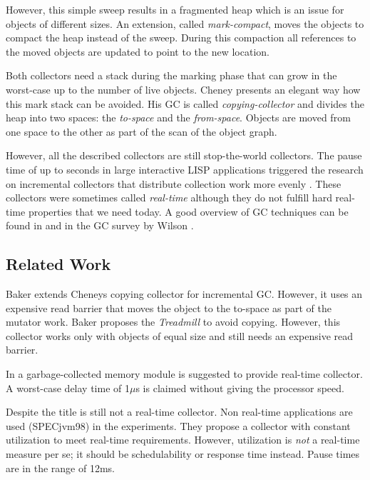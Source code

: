 However, this simple sweep results in a fragmented heap which is an
issue for objects of different sizes. An extension, called
\emph{mark-compact}, moves the objects to compact the heap instead
of the sweep. During this compaction all references to the moved
objects are updated to point to the new location.


Both collectors need a stack during the marking phase that can grow
in the worst-case up to the number of live objects. Cheney
\cite{gc:cheney70} presents an elegant way how this mark stack can
be avoided. His GC is called \emph{copying-collector} and divides
the heap into two spaces: the \emph{to-space} and the
\emph{from-space}. Objects are moved from one space to the other as
part of the scan of the object graph.

However, all the described collectors are still stop-the-world
collectors. The pause time of up to seconds in large interactive
LISP applications triggered the research on incremental collectors
that distribute collection work more evenly \cite{gc:steele75,
gc:dijkstra78, gc:baker78}. These collectors were sometimes called
\emph{real-time} although they do not fulfill hard real-time
properties that we need today. A good overview of GC techniques can
be found in \cite{gc:jone96} and in the GC survey by Wilson
\cite{gc:wils94}.

\subsection{Related Work}

Baker \cite{gc:baker78} extends Cheneys \cite{gc:cheney70} copying
collector for incremental GC. However, it uses an expensive read
barrier that moves the object to the to-space as part of the mutator
work. Baker proposes the \emph{Treadmill} \cite{gc:baker92} to avoid
copying. However, this collector works only with objects of equal
size and still needs an expensive read barrier.

In \cite{gc:hwgc94} a garbage-collected memory module is suggested
to provide real-time collector. A worst-case delay time of 1$\mu$s
is claimed without giving the processor speed.

Despite the title \cite{gc:bacon03} is still not a real-time
collector. Non real-time applications are used (SPECjvm98) in the
experiments. They propose a collector with constant utilization to
meet real-time requirements. However, utilization is \emph{not} a
real-time measure per se; it should be schedulability or response
time instead. Pause times are in the range of 12ms.

